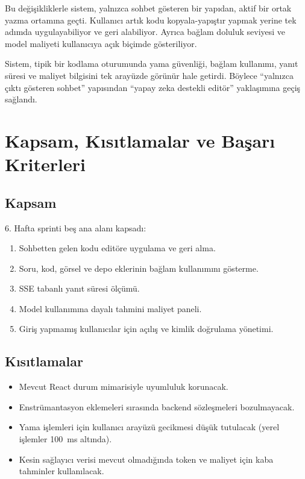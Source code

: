 \documentclass[12pt,a4paper]{article}
\begin{document}
Bu değişikliklerle sistem, yalnızca sohbet gösteren bir yapıdan, aktif bir ortak yazma ortamına geçti. Kullanıcı artık kodu kopyala-yapıştır yapmak yerine tek adımda uygulayabiliyor ve geri alabiliyor. Ayrıca bağlam doluluk seviyesi ve model maliyeti kullanıcıya açık biçimde gösteriliyor.

\begin{infobox}
Sistem, tipik bir kodlama oturumunda yama güvenliği, bağlam kullanımı, yanıt süresi ve maliyet bilgisini tek arayüzde görünür hale getirdi. Böylece ``yalnızca çıktı gösteren sohbet'' yapısından ``yapay zeka destekli editör'' yaklaşımına geçiş sağlandı.
\end{infobox}



\newpage
{}

\section{Kapsam, Kısıtlamalar ve Başarı Kriterleri}

\subsection{Kapsam}
6. Hafta sprinti beş ana alanı kapsadı:
\begin{enumerate}[leftmargin=*]
  \item Sohbetten gelen kodu editöre uygulama ve geri alma.
  \item Soru, kod, görsel ve depo eklerinin bağlam kullanımını gösterme.
  \item SSE tabanlı yanıt süresi ölçümü.
  \item Model kullanımına dayalı tahmini maliyet paneli.
  \item Giriş yapmamış kullanıcılar için açılış ve kimlik doğrulama yönetimi.
\end{enumerate}

\subsection{Kısıtlamalar}
\begin{itemize}[leftmargin=*]
  \item Mevcut React durum mimarisiyle uyumluluk korunacak.
  \item Enstrümantasyon eklemeleri sırasında backend sözleşmeleri bozulmayacak.
  \item Yama işlemleri için kullanıcı arayüzü gecikmesi düşük tutulacak (yerel işlemler 100~ms altında).
  \item Kesin sağlayıcı verisi mevcut olmadığında token ve maliyet için kaba tahminler kullanılacak.
\end{itemize}
\end{document}

